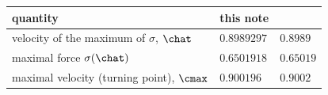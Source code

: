 \begin{tabular}{@{}lll@{}}
\toprule
quantity & this note & \cite{VCKX20}\\
\midrule
velocity of the maximum of $\sigma$, $\chat$ & $0.8989297$ & $0.8989$\\
maximal force $\sigma(\chat)$ & $0.6501918$ & $0.65019$\\
maximal velocity (turning point), $\cmax$ & $0.900196$ & $0.9002$\\
\bottomrule
\end{tabular}
